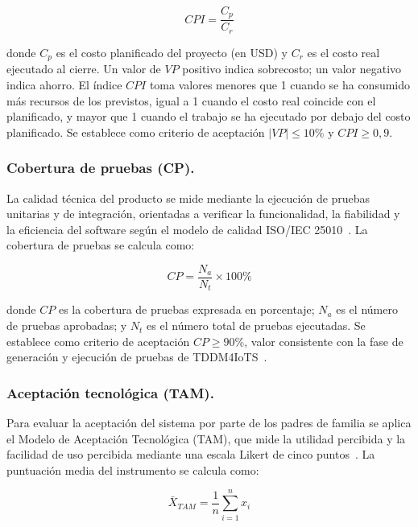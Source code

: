 					\begin{equation}
						\label{ec:cpi}
						CPI = \frac{C_p}{C_r}
					\end{equation}
					
					donde $C_p$ es el costo planificado del proyecto (en USD) y $C_r$ es el costo real ejecutado al cierre. Un valor de $VP$ positivo indica sobrecosto; un valor negativo indica ahorro. El índice $CPI$ toma valores menores que 1 cuando se ha consumido más recursos de los previstos, igual a 1 cuando el costo real coincide con el planificado, y mayor que 1 cuando el trabajo se ha ejecutado por debajo del costo planificado. Se establece como criterio de aceptación $|VP| \leq 10\%$ y $CPI \geq 0{,}9$.
			
				\subsubsection{Cobertura de pruebas (CP).}
					La calidad técnica del producto se mide mediante la ejecución de pruebas unitarias y de integración, orientadas a verificar la funcionalidad, la fiabilidad y la eficiencia del software según el modelo de calidad ISO/IEC 25010~\cite{GuerreroUlloa2024}. La cobertura de pruebas se calcula como:
					
					\begin{equation}
						\label{ec:cp}
						CP = \frac{N_a}{N_t} \times 100\%
					\end{equation}
					
					donde $CP$ es la cobertura de pruebas expresada en porcentaje; $N_a$ es el número de pruebas aprobadas; y $N_t$ es el número total de pruebas ejecutadas. Se establece como criterio de aceptación $CP \geq 90\%$, valor consistente con la fase de generación y ejecución de pruebas de TDDM4IoTS~\cite{GuerreroUlloa2024,Fowler2002}.
			
				\subsubsection{Aceptación tecnológica (TAM).}
					Para evaluar la aceptación del sistema por parte de los padres de familia se aplica el Modelo de Aceptación Tecnológica (TAM), que mide la utilidad percibida y la facilidad de uso percibida mediante una escala Likert de cinco puntos~\cite{Venkatesh2003,Davis1989}. La puntuación media del instrumento se calcula como:
					
					\begin{equation}
						\label{ec:TAM}
						\bar{X}_{TAM} = \frac{1}{n} \sum_{i=1}^{n} x_i
					\end{equation}
					
